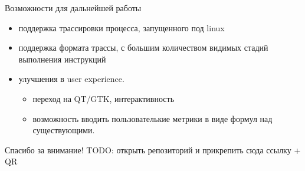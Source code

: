\documentclass[10pt,aspectratio=169,hyperref={pdftex,unicode},xcolor=dvipsnames]{beamer}
\begin{document}
\begin{frame}{ Возможности для дальнейшей работы }
    \begin{itemize}
        \item поддержка трассировки процесса, запущенного под linux
        \item поддержка формата трассы, с большим количеством видимых стадий
              выполнения инструкций
        \item улучшения в user experience.
            \begin{itemize}
                \item переход на QT/GTK, интерактивность
                \item возможность вводить пользователькие метрики в виде формул над существующими.
            \end{itemize}
    \end{itemize}
\end{frame}

\begin{frame}{ Спасибо за внимание! }
TODO: открыть репозиторий и прикрепить сюда ссылку + QR
\end{frame}

%
%
%
%
\end{document}
